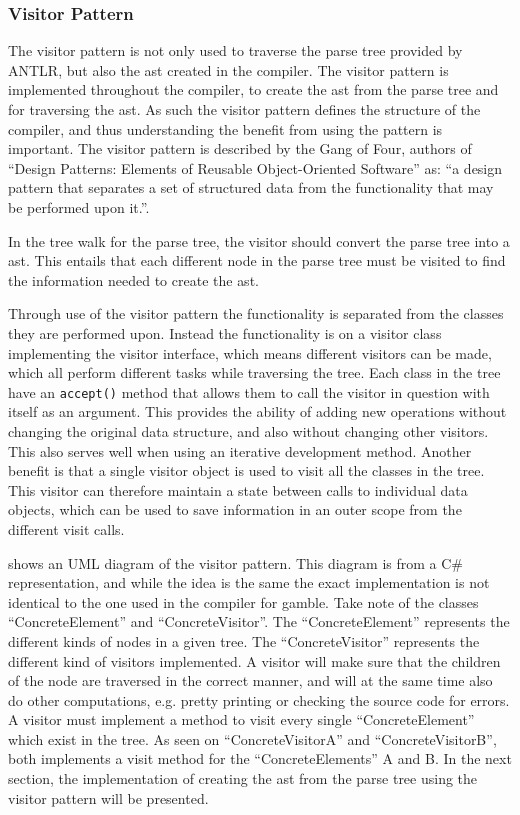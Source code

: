 \subsubsection*{Visitor Pattern}\label{subs:visit}
The visitor pattern is not only used to traverse the parse tree provided by ANTLR, but also the \acrshort{ast} created in the compiler.
The visitor pattern is implemented throughout the compiler, to create the \acrshort{ast} from the parse tree and for traversing the \acrshort{ast}.
As such the visitor pattern defines the structure of the compiler, and thus understanding the benefit from using the pattern is important.
The visitor pattern is described by the Gang of Four, authors of ``Design Patterns: Elements of Reusable Object-Oriented Software'' as:
``a design pattern that separates a set of structured data from the functionality that may be performed upon it.''. \citep{GOF}

In the tree walk for the parse tree, the visitor should convert the parse tree into a \acrshort{ast}.
This entails that each different node in the parse tree must be visited to find the information needed to create the \acrshort{ast}.

Through use of the visitor pattern the functionality is separated from the classes they are performed upon. 
Instead the functionality is on a visitor class implementing the visitor interface, which means different visitors can be made, which all perform different tasks while traversing the tree. 
Each class in the tree have an \texttt{accept()} method that allows them to call the visitor in question with itself as an argument.
This provides the ability of adding new operations without changing the original data structure, and also without changing other visitors.
This also serves well when using an iterative development method.
Another benefit is that a single visitor object is used to visit all the classes in the tree.
This visitor can therefore maintain a state between calls to individual data objects, which can be used to save information in an outer scope from the different visit calls.

 shows an UML diagram of the visitor pattern.
This diagram is from a C\# representation, and while the idea is the same the exact implementation is not identical to the one used in the compiler for \gls{gamble}.
Take note of the classes ``ConcreteElement'' and ``ConcreteVisitor''.
The ``ConcreteElement'' represents the different kinds of nodes in a given tree.
The ``ConcreteVisitor'' represents the different kind of visitors implemented.
A visitor will make sure that the children of the node are traversed in the correct manner, and will at the same time also do other computations, e.g. pretty printing or checking the source code for errors.
A visitor must implement a method to visit every single ``ConcreteElement'' which exist in the tree.
As seen on  ``ConcreteVisitorA'' and ``ConcreteVisitorB'', both implements a visit method for the ``ConcreteElements'' A and B.
In the next section, the implementation of creating the \acrshort{ast} from the parse tree using the visitor pattern will be presented.

